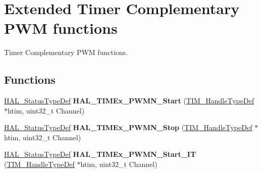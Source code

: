 \hypertarget{group___t_i_m_ex___exported___functions___group3}{}\section{Extended Timer Complementary P\+WM functions}
\label{group___t_i_m_ex___exported___functions___group3}


Timer Complementary P\+WM functions.  


\subsection*{Functions}
\begin{DoxyCompactItemize}
\item 
\mbox{\label{group___t_i_m_ex___exported___functions___group3_ga4f2b0bb4b66a5acd76eac4e8d32cc498}} 
\mbox{\hyperlink{stm32f7xx__hal__def_8h_a63c0679d1cb8b8c684fbb0632743478f}{H\+A\+L\+\_\+\+Status\+Type\+Def}} {\bfseries H\+A\+L\+\_\+\+T\+I\+M\+Ex\+\_\+\+P\+W\+M\+N\+\_\+\+Start} (\mbox{\hyperlink{struct_t_i_m___handle_type_def}{T\+I\+M\+\_\+\+Handle\+Type\+Def}} $\ast$htim, uint32\+\_\+t Channel)
\item 
\mbox{\label{group___t_i_m_ex___exported___functions___group3_ga0f2e27f3fb6d8f42d998e2071e5f0482}} 
\mbox{\hyperlink{stm32f7xx__hal__def_8h_a63c0679d1cb8b8c684fbb0632743478f}{H\+A\+L\+\_\+\+Status\+Type\+Def}} {\bfseries H\+A\+L\+\_\+\+T\+I\+M\+Ex\+\_\+\+P\+W\+M\+N\+\_\+\+Stop} (\mbox{\hyperlink{struct_t_i_m___handle_type_def}{T\+I\+M\+\_\+\+Handle\+Type\+Def}} $\ast$htim, uint32\+\_\+t Channel)
\item 
\mbox{\label{group___t_i_m_ex___exported___functions___group3_ga82f0b53f6b10e6aafc6835178662c488}} 
\mbox{\hyperlink{stm32f7xx__hal__def_8h_a63c0679d1cb8b8c684fbb0632743478f}{H\+A\+L\+\_\+\+Status\+Type\+Def}} {\bfseries H\+A\+L\+\_\+\+T\+I\+M\+Ex\+\_\+\+P\+W\+M\+N\+\_\+\+Start\+\_\+\+IT} (\mbox{\hyperlink{struct_t_i_m___handle_type_def}{T\+I\+M\+\_\+\+Handle\+Type\+Def}} $\ast$htim, uint32\+\_\+t Channel)
\item 
\mbox{\label{group___t_i_m_ex___exported___functions___group3_ga13848e20df29fa552ef4f5b69fef20a6}} 

\end{DoxyCompactItemize}
